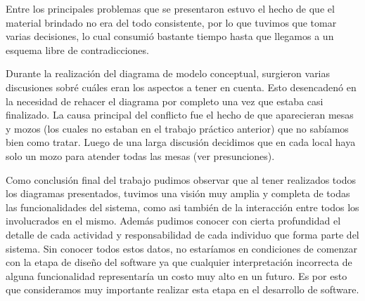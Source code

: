 \documentclass[a4paper,11pt] {article}
\begin{document}
Entre los principales problemas que se presentaron estuvo el hecho de que el material brindado no era del todo consistente, por lo que tuvimos que tomar varias decisiones, lo cual consumi\'o bastante tiempo hasta que llegamos a un esquema libre de contradicciones. 

Durante la realizaci\'on del diagrama de modelo conceptual, surgieron varias discusiones sobr\'e cu\'ales eran los aspectos a tener en cuenta. Esto desencaden\'o en la necesidad de rehacer el diagrama por completo una vez que estaba casi finalizado. La causa principal del conflicto fue el hecho de que aparecieran mesas y mozos (los cuales no estaban en el trabajo pr\'actico anterior) que no sab\'iamos bien como tratar. Luego de una larga discusi\'on decidimos que en cada local haya solo un mozo para atender todas las mesas (ver presunciones).

Como conclusi\'on final del trabajo pudimos observar que al tener realizados todos los diagramas presentados, tuvimos una visi\'on muy amplia y completa de todas las funcionalidades del sistema, como asi tambi\'en de la interacci\'on entre todos los involucrados en el mismo. Adem\'as pudimos conocer con cierta profundidad el detalle de cada actividad y responsabilidad de cada individuo que forma parte del sistema. Sin conocer todos estos datos, no estar\'iamos en condiciones de comenzar con la etapa de dise\~{n}o del software ya que cualquier interpretaci\'on incorrecta de alguna funcionalidad representar\'ia un costo muy alto en un futuro. Es por esto que consideramos muy importante realizar esta etapa en el desarrollo de software.
\end{document}

